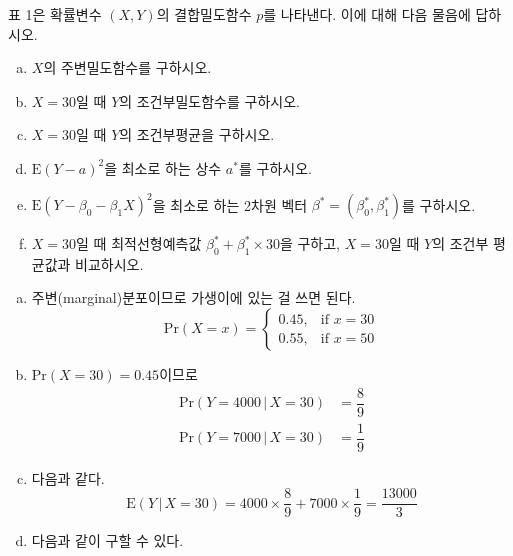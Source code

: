 \documentclass[answers]{exam}
\begin{document}
\newpage
{}
\begin{questions}
   \question
   표 1은 확률변수 $\left(X,Y\right)$의 결합밀도함수 $p$를 나타낸다. 이에 대해 다음 물음에 답하시오.
   \begin{enumerate}[(a)]
    \item $X$의 주변밀도함수를 구하시오.
    \item $X=30$일 때 $Y$의 조건부밀도함수를 구하시오.
    \item $X=30$일 때 $Y$의 조건부평균을 구하시오.
    \item $\mathrm{E}\left(Y-a\right)^{2}$을 최소로 하는 상수 $a^{*}$를 구하시오.
    \item $\mathrm{E}\left(Y-\beta_{0}-\beta_{1}X\right)^{2}$을 최소로 하는 2차원 벡터 $\beta^{*}=\left(\beta_{0}^{*},\beta_{1}^{*}\right)$를 구하시오.
    \item $X=30$일 때 최적선형예측값 $\beta_{0}^{*}+\beta_{1}^{*}\times 30$을 구하고, $X=30$일 때 $Y$의 조건부 평균값과 비교하시오.
   \end{enumerate}
   \begin{solution}
    \begin{enumerate}[(a)]
      \item 주변(marginal)분포이므로 가생이에 있는 걸 쓰면 된다.
      \begin{equation}
        \mathrm{Pr}\left(X=x\right)=\begin{cases}0.45,& \text{if $x=30$}\\0.55,& \text{if $x=50$} \end{cases}
      \end{equation}
      \item $\mathrm{Pr}\left(X=30\right)=0.45$이므로
      \begin{align}
        \mathrm{Pr}\left(Y=4000\,|\,X=30\right) &= \dfrac{8}{9}\\
        \mathrm{Pr}\left(Y=7000\,|\,X=30\right) &= \dfrac{1}{9}
      \end{align}
      \item 다음과 같다.
      \begin{equation}
        \mathrm{E}\left(Y\,|\,X=30\right) = 4000\times\dfrac{8}{9}+7000\times\dfrac{1}{9}=\dfrac{13000}{3}
      \end{equation}
      \item 다음과 같이 구할 수 있다.

\end{enumerate}
\end{solution}
\end{questions}
\end{document}
